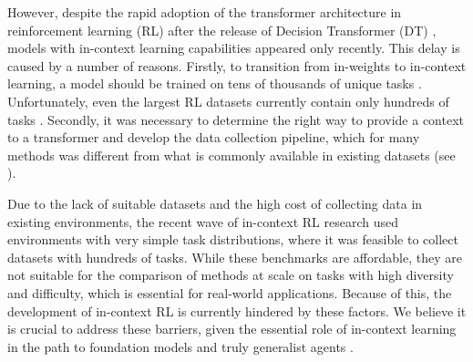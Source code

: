 \documentclass{article}
\begin{document}
However, despite the rapid adoption of the transformer architecture in reinforcement learning (RL) after the release of Decision Transformer (DT) \citep{chen2021decision, hu2022transforming, agarwal2023transformers, li2023survey}, models with in-context learning capabilities appeared only recently. This delay is caused by a number of reasons. Firstly, to transition from in-weights to in-context learning, a model should be trained on tens of thousands of unique tasks \citep{kirsch2022general}. Unfortunately, even the largest RL datasets currently contain only hundreds of tasks \citep{padalkar2023open}. Secondly, it was necessary to determine the right way to provide a context to a transformer and develop the data collection pipeline, which for many methods \citep{laskin2022context, lee2023supervised, shi2024cross} was different from what is commonly available in existing datasets (see ).

Due to the lack of suitable datasets and the high cost of collecting data in existing environments, the recent wave of in-context RL research \citep{laskin2022context, lee2023supervised, norman2023first, kirsch2023towards, sinii2023context, zisman2023emergence} used environments with very simple task distributions, where it was feasible to collect datasets with hundreds of tasks. While these benchmarks are affordable, they are not suitable for the comparison of methods at scale on tasks with high diversity and difficulty, which is essential for real-world applications. Because of this, the development of in-context RL is currently hindered by these factors. We believe it is crucial to address these barriers, given the essential role of in-context learning in the path to foundation models and truly generalist agents \citep{team2021open, team2023human, kirsch2023towards, lu2024structured, liu2024position}.


\end{document}

